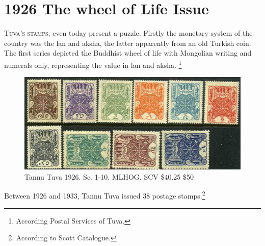 \section{1926 The wheel of Life Issue}

\lettrine{T}{uva's stamps}, even today present a puzzle. Firstly the monetary system of the country was the lan and aksha, the latter apparently from an old Turkish coin. The first series depicted the Buddhist wheel of life with Mongolian writing and numerals only, representing the value in lan and aksha.
\footnote{According Postal Services of Tuva.} 

\begin{fullwidth}
\begin{figure}[htp]
\includegraphics[width=.95\textwidth]{../tannu-tuva/1926-set.jpg}
\caption{Tannu Tuva 1926. Sc. 1-10. MLHOG. SCV \$40.25  \$50}
\end{figure}
\end{fullwidth}

Between 1926 and 1933, Tannu Tuva issued 38 postage stamps.\footnote{According to Scott Catalogue.}






                                                                      